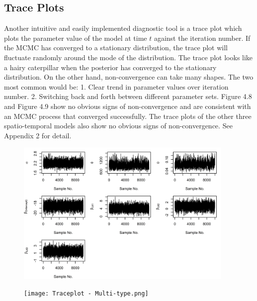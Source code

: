 \documentclass[12pt,a4paper]{report}
\begin{document}
\subsection{Trace Plots}

Another intuitive and easily implemented diagnostic tool is a trace plot
which plots the parameter value of the model at time $t$ against the iteration
number. If the MCMC has converged to a stationary distribution, the trace plot will fluctuate randomly around the mode of the distribution. The trace plot looks like a hairy caterpillar when the posterior has converged to the stationary distribution.  On the other hand, non-convergence can take many shapes. The two most common would be: 1. Clear trend in parameter values over iteration number.
2. Switching back and forth between different parameter sets. Figure 4.8 and Figure 4.9 show no obvious signs of non-convergence and are consistent with an MCMC process that converged successfully. The trace plots of the other three spatio-temporal models also show no obvious signs of non-convergence. See Appendix 2 for detail.

\begin{figure}[H]
\begin{center}
\includegraphics[width = \linewidth, height = 70mm]{Traceplots for Beta and Eta - All Cases.png}
\end{center}
\end{figure}

\begin{figure}[H]
\begin{center}
\texttt{[image: Traceplot - Multi-type.png]}
\end{center}
\end{figure}
\end{document}
